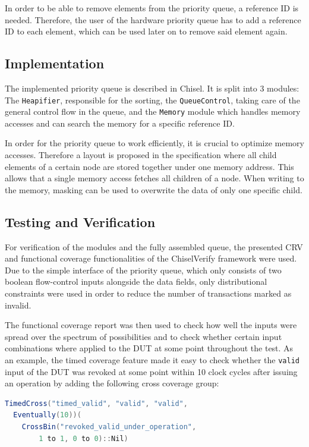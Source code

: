 \documentclass[conference]{IEEEtran}
\begin{document}
In order to be able to remove elements from the priority queue, a reference ID is needed. Therefore, the user of the hardware priority queue has to add a reference ID to each element, which can be used later on to remove said element again.

\subsection{Implementation}

The implemented priority queue is described in Chisel.
It is split into 3 modules: The \texttt{Heapifier}, responsible for the sorting, the \texttt{QueueControl}, taking care
of the general control flow in the queue, and the \texttt{Memory} module which handles memory accesses and can search the memory for a specific reference 
ID.

In order for the priority queue to work efficiently, it is crucial to optimize memory accesses. Therefore a layout is proposed in the specification where all 
child elements of a certain node are stored together under one memory address. This allows that a single memory access fetches all children of a node. When writing to the memory, masking can be used to overwrite the data of only one specific child.


\subsection{Testing and Verification}

For verification of the modules and the fully assembled queue, the presented CRV and functional coverage functionalities of the ChiselVerify framework were used. Due to the simple interface of the priority queue, which only consists of two boolean flow-control inputs alongside the data fields, only distributional constraints were used in order to reduce the number of transactions marked as invalid. 

The functional coverage report was then used to check how well the inputs were spread over the spectrum of possibilities and to check whether certain input combinations where applied to the DUT at some point throughout the test. As an example, the timed coverage feature made it easy to check whether the \texttt{valid} input of the DUT was revoked at some point within 10 clock cycles after issuing an operation by adding the following cross coverage group:

\begin{lstlisting}[language=scala, caption={A timed coverage group.}, label={lst:axitest}]
TimedCross("timed_valid", "valid", "valid",
  Eventually(10))(
    CrossBin("revoked_valid_under_operation",
        1 to 1, 0 to 0)::Nil)
\end{lstlisting}
\end{document}
